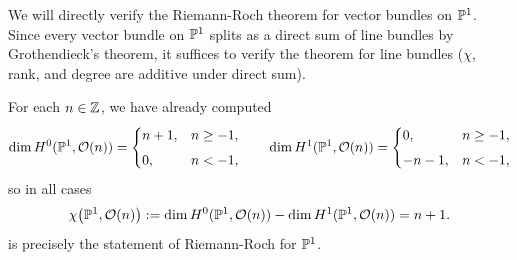 \documentclass[12pt]{article}
\begin{document}
\begin{example}
     We will directly verify the Riemann-Roch theorem for vector bundles on $\P^1$. Since every vector bundle on $\P^1$ splits as a direct sum of line bundles by Grothendieck's theorem, it suffices to verify the theorem for line bundles ($\chi$, rank, and degree are additive under direct sum). 

    
For each $n\in\Z$, we have already computed
\[
\dim H^{0}(\P^{1},\cO(n)) =
\begin{cases}
n+1, & n\ge -1,\\[4pt]
0, & n<-1,
\end{cases}
\qquad
\dim H^{1}(\P^{1},\cO(n)) =
\begin{cases}
0, & n\ge -1,\\[4pt]
-n-1, & n<-1,
\end{cases}
\]
so in all cases
\[
\chi\bigl(\P^{1},\cO(n)\bigr)
:= \dim H^{0}(\P^{1},\cO(n)) - \dim H^{1}(\P^{1},\cO(n))
= n+1.
\]
is precisely the statement of Riemann-Roch for $\P^1$.
\end{example}
\end{document}
